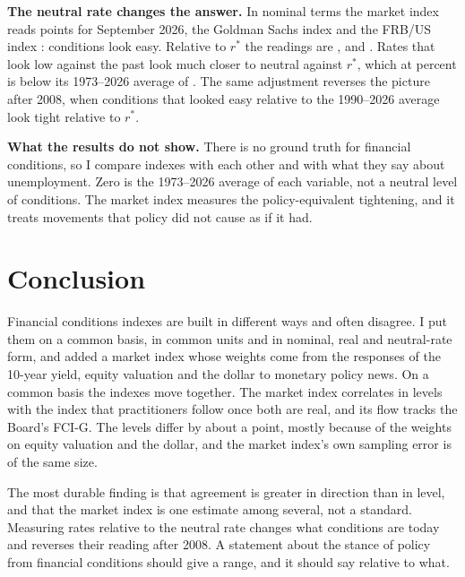 \documentclass[11pt]{article}
\newcommand{\rs}{r^{*}}
\begin{document}
\textbf{The neutral rate changes the answer.} In nominal terms the market index reads  points for September 2026, the Goldman Sachs index  and the FRB/US index : conditions look easy. Relative to $\rs$ the readings are ,  and . Rates that look low against the past look much closer to neutral against $\rs$, which at  percent is below its 1973--2026 average of . The same adjustment reverses the picture after 2008, when conditions that looked easy relative to the 1990--2026 average look tight relative to $\rs$.

\textbf{What the results do not show.} There is no ground truth for financial conditions, so I compare indexes with each other and with what they say about unemployment. Zero is the 1973--2026 average of each variable, not a neutral level of conditions. The market index measures the policy-equivalent tightening, and it treats movements that policy did not cause as if it had.
\FloatBarrier

\section{Conclusion}\label{sec:conclusion}
Financial conditions indexes are built in different ways and often disagree. I put them on a common basis, in common units and in nominal, real and neutral-rate form, and added a market index whose weights come from the responses of the 10-year yield, equity valuation and the dollar to monetary policy news. On a common basis the indexes move together. The market index correlates  in levels with the index that practitioners follow once both are real, and its flow tracks the Board's FCI-G. The levels differ by about a point, mostly because of the weights on equity valuation and the dollar, and the market index's own sampling error is of the same size.

The most durable finding is that agreement is greater in direction than in level, and that the market index is one estimate among several, not a standard. Measuring rates relative to the neutral rate changes what conditions are today and reverses their reading after 2008. A statement about the stance of policy from financial conditions should give a range, and it should say relative to what.

\FloatBarrier


\end{document}
